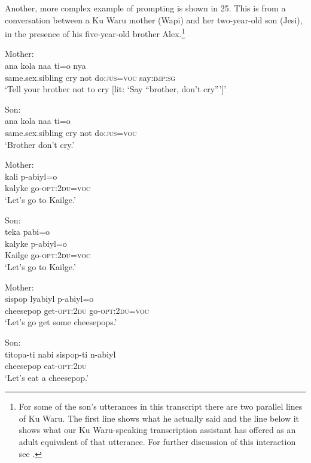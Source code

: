 \documentclass[output=paper]{langsci/langscibook}
\begin{document}
Another, more complex example of prompting is shown in 25. This is from a conversation between a Ku Waru mother (Wapi) and her two-year-old son (Jesi), in the presence of his five-year-old brother Alex.\footnote{ For some of the son’s utterances in this transcript there are two parallel lines of Ku Waru. The first line shows what he actually said and the line below it shows what our Ku Waru-speaking transcription assistant has offered as an adult equivalent of that utterance.  For further discussion of this interaction see \cite{Rumsey2014}.}

\begin{exe}
	\ex \label{ex:ar25}
	\begin{xlist}
	\ex Mother:\label{ex:ar25a}\\
	\gll ana kola naa ti=o nya\\
	same.sex.sibling cry not do:\textsc{jus}=\textsc{voc} say:\textsc{imp}:\textsc{sg}\\
	\trans ‘Tell your brother not to cry [lit: ‘Say “brother, don’t cry”’]’ 	
	
	\ex Son:\label{ex:ar25b}\\
	\gll ana kola naa ti=o\\
	same.sex.sibling cry not do:\textsc{jus}=\textsc{voc}\\
	\trans ‘Brother don’t cry.’
	
	\ex Mother:\label{ex:ar25c}\\
	\gll kali p-abiyl=o\\
	kalyke go-\textsc{opt}:2\textsc{du}=\textsc{voc}\\
	\trans ‘Let’s go to Kailge.’
	
	\ex Son:\label{ex:ar25d}\\
	\glll teka pabi=o\\
	kalyke p-abiyl=o\\
	Kailge go-\textsc{opt}:2\textsc{du}=\textsc{voc}\\
	\trans ‘Let’s go to Kailge.’
	
	\ex 	Mother: \label{ex:ar25e}\\
	\gll sispop lyabiyl p-abiyl=o\\
	cheesepop get-\textsc{opt}:2\textsc{du} go-\textsc{opt}:2\textsc{du}=\textsc{voc}\\
	\trans ‘Let’s go get some cheesepops.’
	
	\ex Son:	\label{ex:ar25f}\\
	\gll titopa-ti nabi sispop-ti n-abiyl\\
	cheesepop eat-\textsc{opt}:2\textsc{du}\\
	\trans ‘Let’s eat a cheesepop.’
	

\end{xlist}
\end{exe}
\end{document}
